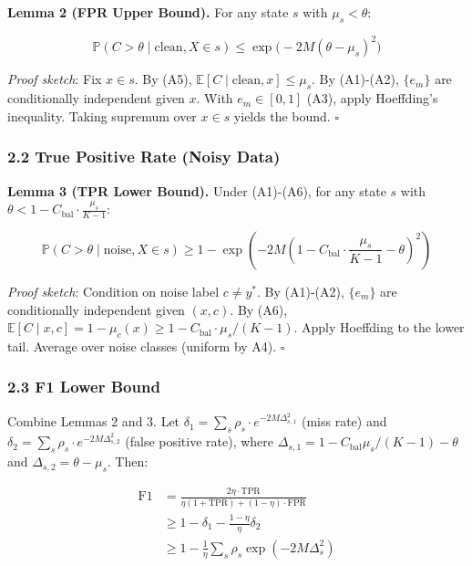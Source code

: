 \documentclass[
  12pt,
]{ctexart}
\begin{document}
\textbf{Lemma 2 (FPR Upper Bound).} For any state \(s\) with
\(\mu_s < \theta\):

\[\mathbb{P}(C > \theta \mid \text{clean}, X \in s) \leq \exp\!\bigl(-2M(\theta - \mu_s)^2\bigr)\]

\emph{Proof sketch}: Fix \(x \in s\). By (A5),
\(\mathbb{E}[C \mid \text{clean}, x] \leq \mu_s\). By (A1)-(A2),
\(\{e_m\}\) are conditionally independent given \(x\). With
\(e_m \in [0, 1]\) (A3), apply Hoeffding's inequality. Taking supremum
over \(x \in s\) yields the bound. \(\square\)

\subsubsection{2.2 True Positive Rate (Noisy
Data)}\label{true-positive-rate-noisy-data}

\textbf{Lemma 3 (TPR Lower Bound).} Under (A1)-(A6), for any state \(s\)
with \(\theta < 1 - C_{\text{bal}} \cdot \frac{\mu_s}{K-1}\):

\[\mathbb{P}(C > \theta \mid \text{noise}, X \in s) \geq 1 - \exp\!\left(-2M\left(1 - C_{\text{bal}} \cdot \frac{\mu_s}{K-1} - \theta\right)^2\right)\]

\emph{Proof sketch}: Condition on noise label \(c \neq y^*\). By
(A1)-(A2), \(\{e_m\}\) are conditionally independent given \((x, c)\).
By (A6),
\(\mathbb{E}[C \mid x, c] = 1 - \mu_c(x) \geq 1 - C_{\text{bal}} \cdot \mu_s/(K-1)\).
Apply Hoeffding to the lower tail. Average over noise classes (uniform
by A4). \(\square\)

\subsubsection{2.3 F1 Lower Bound}\label{f1-lower-bound}

Combine Lemmas 2 and 3. Let
\(\delta_1 = \sum_s \rho_s \cdot e^{-2M\Delta_{s,1}^2}\) (miss rate) and
\(\delta_2 = \sum_s \rho_s \cdot e^{-2M\Delta_{s,2}^2}\) (false positive
rate), where \(\Delta_{s,1} = 1 - C_{\text{bal}}\mu_s/(K-1) - \theta\)
and \(\Delta_{s,2} = \theta - \mu_s\). Then:

\[\begin{aligned}
\text{F1} &= \frac{2\eta \cdot \text{TPR}}{\eta(1 + \text{TPR}) + (1-\eta) \cdot \text{FPR}} \\
&\geq 1 - \delta_1 - \frac{1-\eta}{\eta} \delta_2 \\
&\geq 1 - \frac{1}{\eta} \sum_s \rho_s \exp(-2M\Delta_s^2)
\end{aligned}\]
\end{document}
